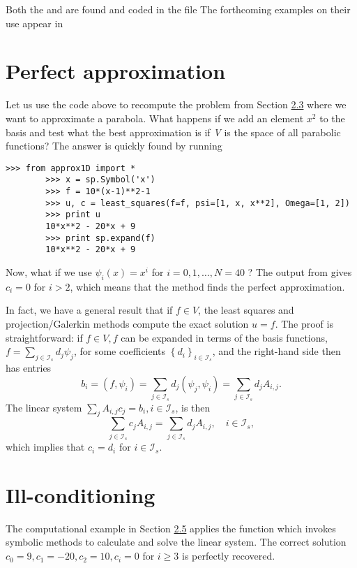 \documentclass[../main.tex]{subfiles}
\begin{document}
	Both the  and  are found and coded in the
	file  The forthcoming examples on their use appear in 
	\section[Perfect approximation]{Perfect approximation}
	\label{sec:sec_2_5}
	Let us use the code above to recompute the problem from Section \hyperref[sec:sec_2_3]{2.3} where we want to approximate a parabola. What happens if we add an element $x^{2}$ to the basis and test what the best approximation is if \textit{V} is the space of all parabolic
	functions? The answer is quickly found by running
	\begin{lstlisting}[numbers=none]
		>>> from approx1D import *
		>>> x = sp.Symbol('x')
		>>> f = 10*(x-1)**2-1
		>>> u, c = least_squares(f=f, psi=[1, x, x**2], Omega=[1, 2])
		>>> print u
		10*x**2 - 20*x + 9
		>>> print sp.expand(f)
		10*x**2 - 20*x + 9
	\end{lstlisting}
	Now, what if we use $\psi_{i}(x)=x^{i}$ for $i=0,1, \ldots, N=40$ ? The output from  gives $c_{i}=0$ for $i>2$, which means that the method finds the perfect approximation.
	
	In fact, we have a general result that if $f \in V$, the least squares and projection/Galerkin methods compute the exact solution $u=f$. The proof is straightforward: if $f \in V, f$ can be expanded in terms of the basis functions, $f=\sum_{j \in \mathcal{I}_{s}} d_{j} \psi_{j}$, for some coefficients $\left\{d_{i}\right\}_{i \in \mathcal{I}_{s}}$, and the right-hand side then has entries
	$$
	b_{i}=\left(f, \psi_{i}\right)=\sum_{j \in \mathcal{I}_{s}} d_{j}\left(\psi_{j}, \psi_{i}\right)=\sum_{j \in \mathcal{I}_{s}} d_{j} A_{i, j}.
	$$
	The linear system $\sum_{j} A_{i, j} c_{j}=b_{i}, i \in \mathcal{I}_{s}$, is then
	$$
	\sum_{j \in \mathcal{I}_{s}} c_{j} A_{i, j}=\sum_{j \in \mathcal{I}_{s}} d_{j} A_{i, j}, \quad i \in \mathcal{I}_{s},
	$$
	which implies that $c_{i}=d_{i}$ for $i \in \mathcal{I}_{s}$.
	\section[Ill-conditioning]{Ill-conditioning}
	\label{sec:sec_2_6}
	The computational example in Section \hyperref[sec:sec_2_5]{2.5} applies the  function which invokes symbolic methods to calculate and solve the linear system. The correct solution $c_{0}=9, c_{1}=-20, c_{2}=10, c_{i}=0$ for $i \geq 3$ is perfectly recovered.
	
\end{document}
